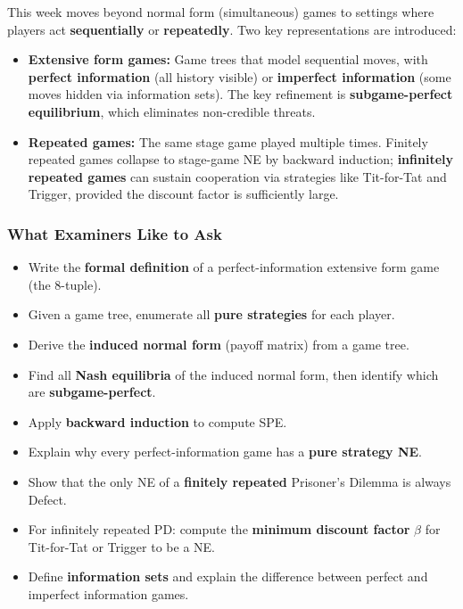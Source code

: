 This week moves beyond normal form (simultaneous) games to settings where players act \textbf{sequentially} or \textbf{repeatedly}. Two key representations are introduced:

\begin{itemize}
  \item \textbf{Extensive form games:} Game trees that model sequential moves, with \textbf{perfect information} (all history visible) or \textbf{imperfect information} (some moves hidden via information sets). The key refinement is \textbf{subgame-perfect equilibrium}, which eliminates non-credible threats.
  \item \textbf{Repeated games:} The same stage game played multiple times. Finitely repeated games collapse to stage-game NE by backward induction; \textbf{infinitely repeated games} can sustain cooperation via strategies like Tit-for-Tat and Trigger, provided the discount factor is sufficiently large.
\end{itemize}

\separator

\subsubsection*{What Examiners Like to Ask}

\begin{itemize}
  \item Write the \textbf{formal definition} of a perfect-information extensive form game (the 8-tuple).
  \item Given a game tree, enumerate all \textbf{pure strategies} for each player.
  \item Derive the \textbf{induced normal form} (payoff matrix) from a game tree.
  \item Find all \textbf{Nash equilibria} of the induced normal form, then identify which are \textbf{subgame-perfect}.
  \item Apply \textbf{backward induction} to compute SPE.
  \item Explain why every perfect-information game has a \textbf{pure strategy NE}.
  \item Show that the only NE of a \textbf{finitely repeated} Prisoner's Dilemma is always Defect.
  \item For infinitely repeated PD: compute the \textbf{minimum discount factor} $\beta$ for Tit-for-Tat or Trigger to be a NE.
  \item Define \textbf{information sets} and explain the difference between perfect and imperfect information games.
\end{itemize}

